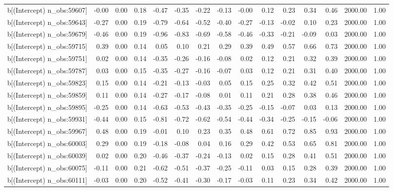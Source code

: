 \begin{table}[ht]
\begin{tabular}{rrrrrrrrrrrrrrr}
  b[(Intercept) n\_obs:59607] & -0.00 & 0.00 & 0.18 & -0.47 & -0.35 & -0.22 & -0.13 & -0.00 & 0.12 & 0.23 & 0.34 & 0.46 & 2000.00 & 1.00 \\ 
  b[(Intercept) n\_obs:59643] & -0.27 & 0.00 & 0.19 & -0.79 & -0.64 & -0.52 & -0.40 & -0.27 & -0.13 & -0.02 & 0.10 & 0.23 & 2000.00 & 1.00 \\ 
  b[(Intercept) n\_obs:59679] & -0.46 & 0.00 & 0.19 & -0.96 & -0.83 & -0.69 & -0.58 & -0.46 & -0.33 & -0.21 & -0.09 & 0.03 & 2000.00 & 1.00 \\ 
  b[(Intercept) n\_obs:59715] & 0.39 & 0.00 & 0.14 & 0.05 & 0.10 & 0.21 & 0.29 & 0.39 & 0.49 & 0.57 & 0.66 & 0.73 & 2000.00 & 1.00 \\ 
  b[(Intercept) n\_obs:59751] & 0.02 & 0.00 & 0.14 & -0.35 & -0.26 & -0.16 & -0.08 & 0.02 & 0.12 & 0.21 & 0.32 & 0.39 & 2000.00 & 1.00 \\ 
  b[(Intercept) n\_obs:59787] & 0.03 & 0.00 & 0.15 & -0.35 & -0.27 & -0.16 & -0.07 & 0.03 & 0.12 & 0.21 & 0.31 & 0.40 & 2000.00 & 1.00 \\ 
  b[(Intercept) n\_obs:59823] & 0.15 & 0.00 & 0.14 & -0.21 & -0.13 & -0.03 & 0.05 & 0.15 & 0.25 & 0.32 & 0.42 & 0.51 & 2000.00 & 1.00 \\ 
  b[(Intercept) n\_obs:59859] & 0.11 & 0.00 & 0.14 & -0.27 & -0.17 & -0.08 & 0.01 & 0.11 & 0.21 & 0.28 & 0.38 & 0.46 & 2000.00 & 1.00 \\ 
  b[(Intercept) n\_obs:59895] & -0.25 & 0.00 & 0.14 & -0.63 & -0.53 & -0.43 & -0.35 & -0.25 & -0.15 & -0.07 & 0.03 & 0.13 & 2000.00 & 1.00 \\ 
  b[(Intercept) n\_obs:59931] & -0.44 & 0.00 & 0.15 & -0.81 & -0.72 & -0.62 & -0.54 & -0.44 & -0.34 & -0.25 & -0.15 & -0.06 & 2000.00 & 1.00 \\ 
  b[(Intercept) n\_obs:59967] & 0.48 & 0.00 & 0.19 & -0.01 & 0.10 & 0.23 & 0.35 & 0.48 & 0.61 & 0.72 & 0.85 & 0.93 & 2000.00 & 1.00 \\ 
  b[(Intercept) n\_obs:60003] & 0.29 & 0.00 & 0.19 & -0.18 & -0.08 & 0.04 & 0.16 & 0.29 & 0.42 & 0.53 & 0.65 & 0.81 & 2000.00 & 1.00 \\ 
  b[(Intercept) n\_obs:60039] & 0.02 & 0.00 & 0.20 & -0.46 & -0.37 & -0.24 & -0.13 & 0.02 & 0.15 & 0.28 & 0.41 & 0.51 & 2000.00 & 1.00 \\ 
  b[(Intercept) n\_obs:60075] & -0.11 & 0.00 & 0.21 & -0.62 & -0.51 & -0.37 & -0.25 & -0.11 & 0.03 & 0.15 & 0.28 & 0.39 & 2000.00 & 1.00 \\ 
  b[(Intercept) n\_obs:60111] & -0.03 & 0.00 & 0.20 & -0.52 & -0.41 & -0.30 & -0.17 & -0.03 & 0.11 & 0.23 & 0.34 & 0.42 & 2000.00 & 1.00 \\ 

\end{tabular}
\end{table}
